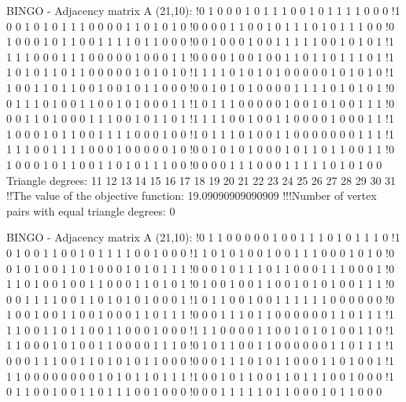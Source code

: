 BINGO - Adjacency matrix A (21,10):
!0 1 0 0 0 1 0 1 1 1 0 0 1 0 1 1 1 1 0 0 0 
!1 0 0 1 0 1 0 1 1 1 0 0 0 0 1 1 0 1 0 1 0 
!0 0 0 0 1 1 0 0 1 0 1 1 1 0 1 0 1 1 1 0 0 
!0 1 0 0 0 1 0 1 1 0 0 1 1 1 1 0 1 1 0 0 0 
!0 0 1 0 0 0 1 0 0 1 1 1 1 1 0 0 1 0 1 0 1 
!1 1 1 1 0 0 0 1 1 1 0 0 0 0 0 1 0 0 0 1 1 
!0 0 0 0 1 0 0 1 0 0 1 1 0 1 1 0 1 1 1 0 1 
!1 1 0 1 0 1 1 0 1 1 0 0 0 0 0 1 0 1 0 1 0 
!1 1 1 1 0 1 0 1 0 1 0 0 0 0 0 1 0 1 0 1 0 
!1 1 0 0 1 1 0 1 1 0 0 1 0 0 1 0 1 1 0 0 0 
!0 0 1 0 1 0 1 0 0 0 0 1 1 1 1 0 1 0 1 0 1 
!0 0 1 1 1 0 1 0 0 1 1 0 0 1 0 1 0 0 0 1 1 
!1 0 1 1 1 0 0 0 0 0 1 0 0 1 0 1 0 0 1 1 1 
!0 0 0 1 1 0 1 0 0 0 1 1 1 0 0 1 0 1 1 0 1 
!1 1 1 1 0 0 1 0 0 1 1 0 0 0 0 1 0 0 0 1 1 
!1 1 0 0 0 1 0 1 1 0 0 1 1 1 1 0 0 0 1 0 0 
!1 0 1 1 1 0 1 0 0 1 1 0 0 0 0 0 0 0 1 1 1 
!1 1 1 1 0 0 1 1 1 1 0 0 0 1 0 0 0 0 0 1 0 
!0 0 1 0 1 0 1 0 0 0 1 0 1 1 0 1 1 0 0 1 1 
!0 1 0 0 0 1 0 1 1 0 0 1 1 0 1 0 1 1 1 0 0 
!0 0 0 0 1 1 1 0 0 0 1 1 1 1 1 0 1 0 1 0 0 
Triangle degrees:
11 12 13 14 15 16 17 18 19 20 21 22 23 24 25 26 27 28 29 30 31 
!!The value of the objective function: 19.09090909090909
!!!Number of vertex pairs with equal triangle degrees: 0


BINGO - Adjacency matrix A (21,10):
!0 1 1 0 0 0 0 0 1 0 0 1 1 1 0 1 0 1 1 1 0
!1 0 1 0 0 1 1 0 0 1 0 1 1 1 1 0 0 1 0 0 0
!1 1 0 1 0 1 0 0 1 0 0 1 1 1 0 0 0 1 0 1 0
!0 0 1 0 1 0 0 1 1 0 1 0 0 0 1 0 1 0 1 1 1
!0 0 0 1 0 1 1 1 0 1 1 0 0 0 1 1 1 0 0 0 1
!0 1 1 0 1 0 0 1 0 0 1 1 0 0 0 1 1 0 1 0 1
!0 1 0 0 1 0 0 1 1 0 0 1 0 1 0 1 0 0 1 1 1
!0 0 0 1 1 1 1 0 0 1 1 0 1 0 1 0 1 0 0 0 1
!1 0 1 1 0 0 1 0 0 1 1 1 1 1 1 0 0 0 0 0 0
!0 1 0 0 1 0 0 1 1 0 0 1 0 0 0 1 1 0 1 1 1
!0 0 0 1 1 1 0 1 1 0 0 0 0 0 0 1 1 0 1 1 1
!1 1 1 0 0 1 1 0 1 1 0 0 1 1 0 0 0 1 0 0 0
!1 1 1 0 0 0 0 1 1 0 0 1 0 1 0 1 0 0 1 1 0
!1 1 1 0 0 0 1 0 1 0 0 1 1 0 0 0 0 1 1 1 0
!0 1 0 1 1 0 0 1 1 0 0 0 0 0 0 1 1 0 1 1 1
!1 0 0 0 1 1 1 0 0 1 1 0 1 0 1 0 1 1 0 0 0
!0 0 0 1 1 1 0 1 0 1 1 0 0 0 1 1 0 1 0 0 1
!1 1 1 0 0 0 0 0 0 0 0 1 0 1 0 1 1 0 1 1 1
!1 0 0 1 0 1 1 0 0 1 1 0 1 1 1 0 0 1 0 0 0
!1 0 1 1 0 0 1 0 0 1 1 0 1 1 1 0 0 1 0 0 0
!0 0 0 1 1 1 1 1 0 1 1 0 0 0 1 0 1 1 0 0 0



